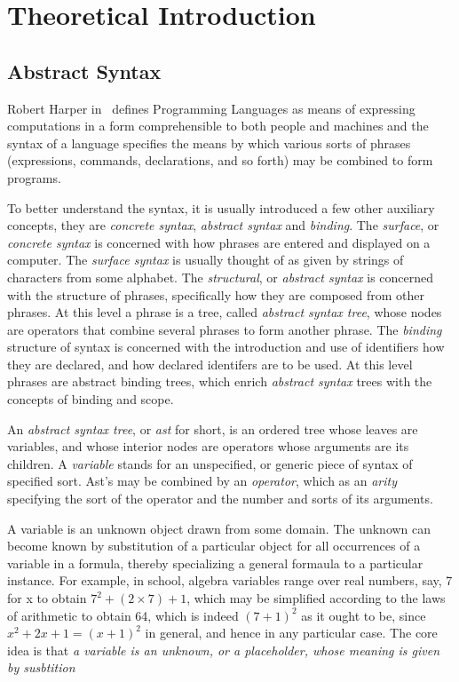\chapter{Theoretical Introduction}


\section{Abstract Syntax}
Robert Harper in~\cite{practicalFoundations} defines Programming Languages
as means of expressing computations in a form comprehensible to
both people and machines and the syntax of a language specifies the means
by which various sorts of phrases (expressions, commands, declarations, and
so forth) may be combined to form programs.

To better understand the syntax, it is usually introduced a few other auxiliary
concepts, they are \textit{concrete syntax}, \textit{abstract syntax} and
\textit{binding}.
The \textit{surface}, or \textit{concrete syntax} is concerned with how
phrases are entered and displayed on a computer. The \textit{surface
syntax} is usually thought of as given by strings of characters from some
alphabet. 
The \textit{structural}, or \textit{abstract syntax} is concerned
with the structure of phrases, specifically how they are composed from
other phrases. 
At this level a phrase is a tree, called \textit{abstract
syntax tree}, whose nodes are operators that combine several phrases to
form another phrase. The \textit{binding} structure of syntax is concerned
with the introduction and use of identifiers how they are declared, and how
declared identifers are to be used. At  this level phrases are abstract
binding trees, which enrich \textit{abstract syntax} trees with the
concepts of binding and scope.

An \textit{abstract syntax tree}, or \textit{ast} for short, is an
ordered tree whose leaves are variables, and whose interior nodes are
operators whose arguments are its children. A \textit{variable} stands
for an unspecified, or generic piece of syntax of specified sort. Ast's
may be combined by an \textit{operator}, which as an \textit{arity}
specifying the sort of the operator and the number and sorts of its
arguments. 

A variable is an unknown object drawn from some domain. The unknown can
become known by substitution of a particular object for all occurrences of
a variable in a formula, thereby specializing a general formaula to a
particular instance. For example, in school, algebra variables range over
real numbers, say, 7 for x to obtain $7^2 + (2 \times 7) + 1$, which may be
simplified according to the laws of arithmetic to obtain 64, which is
indeed ${(7+1)}^2$ as it ought to be, since $x^2 + 2x + 1 = {(x + 1)}^2$ in
general, and hence in any particular case. The core idea is that \textit{a
variable is an unknown, or a placeholder, whose meaning is given by
susbtition}

